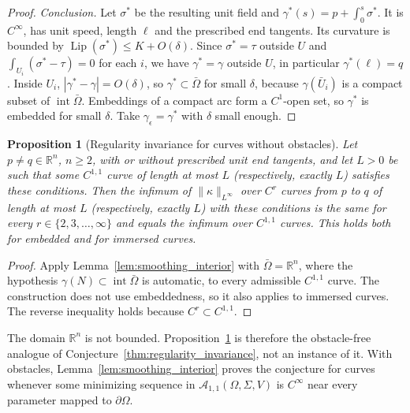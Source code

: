\documentclass[11pt,reqno]{amsart}
\newtheorem{proposition}[theorem]{Proposition}
\theoremstyle{definition}
\providecommand{\R}{\mathbb{R}}
\numberwithin{equation}{section}
\providecommand{\R}{\mathbb{R}}
\begin{document}
\begin{proof}
\emph{Conclusion.} Let $\sigma^*$ be the resulting unit field and $\gamma^*(s) = p + \int_0^s \sigma^*$. It is $C^\infty$, has unit speed, length $\ell$ and the prescribed end tangents. Its curvature is bounded by $\operatorname{Lip}(\sigma^*) \le K + O(\delta)$. Since $\sigma^* = \tau$ outside $U$ and $\int_{U_i}(\sigma^* - \tau) = 0$ for each $i$, we have $\gamma^* = \gamma$ outside $U$, in particular $\gamma^*(\ell) = q$. Inside $U_i$, $|\gamma^* - \gamma| = O(\delta)$, so $\gamma^* \subset \bar\Omega$ for small $\delta$, because $\gamma(\bar U_i)$ is a compact subset of $\operatorname{int}\bar\Omega$. Embeddings of a compact arc form a $C^1$-open set, so $\gamma^*$ is embedded for small $\delta$. Take $\gamma_\epsilon = \gamma^*$ with $\delta$ small enough.
\end{proof}

\begin{proposition}[Regularity invariance for curves without obstacles]
\label{prop:regularity_free}
Let $p \ne q \in \R^n$, $n \ge 2$, with or without prescribed unit end tangents, and let $L > 0$ be such that some $C^{1,1}$ curve of length at most $L$ (respectively, exactly $L$) satisfies these conditions. Then the infimum of $\|\kappa\|_{L^\infty}$ over $C^r$ curves from $p$ to $q$ of length at most $L$ (respectively, exactly $L$) with these conditions is the same for every $r \in \{2, 3, \dots, \infty\}$ and equals the infimum over $C^{1,1}$ curves. This holds both for embedded and for immersed curves.
\end{proposition}

\begin{proof}
Apply Lemma~\ref{lem:smoothing_interior} with $\bar\Omega = \R^n$, where the hypothesis $\gamma(N) \subset \operatorname{int}\bar\Omega$ is automatic, to every admissible $C^{1,1}$ curve. The construction does not use embeddedness, so it also applies to immersed curves. The reverse inequality holds because $C^r \subset C^{1,1}$.
\end{proof}

The domain $\R^n$ is not bounded. Proposition~\ref{prop:regularity_free} is therefore the obstacle-free analogue of Conjecture~\ref{thm:regularity_invariance}, not an instance of it. With obstacles, Lemma~\ref{lem:smoothing_interior} proves the conjecture for curves whenever some minimizing sequence in $\mathcal{A}_{1,1}(\Omega, \Sigma, V)$ is $C^\infty$ near every parameter mapped to $\partial\Omega$.
\end{document}
